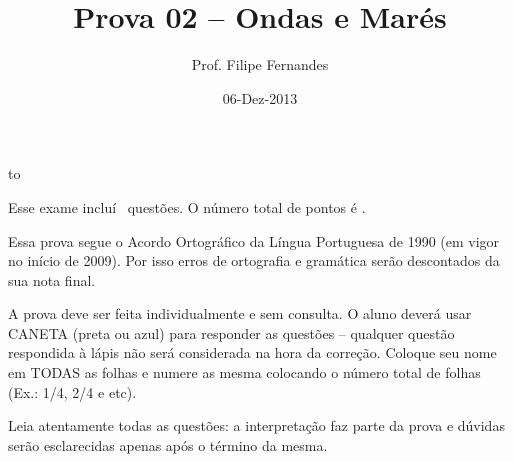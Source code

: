 \documentclass[letterpaper,portuguese,12pt,pdftex]{exam}
\title{Prova 02 -- Ondas e Marés}
\author{Prof. Filipe Fernandes}
\date{06-Dez-2013}
\begin{document}
\maketitle
\doublespacing

\vspace{2cm}
\hbox to \textwidth{Nome e número de matrícula:\enspace\hrulefill}
\vspace{2cm}

\begin{minipage}{.8\textwidth}
Esse exame incluí \numquestions\ questões. O número total de pontos é \numpoints.
\vspace{1cm}

Essa prova segue o Acordo Ortográfico da Língua Portuguesa de 1990 (em vigor no
início de 2009).  Por isso erros de ortografia e gramática serão descontados da
sua nota final.

A prova deve ser feita individualmente e sem consulta.  O aluno deverá usar
CANETA (preta ou azul) para responder as questões – qualquer questão respondida
à lápis não será considerada na hora da correção.  Coloque seu nome em TODAS as
folhas e numere as mesma colocando o número total de folhas (Ex.: 1/4, 2/4 e
etc).

\vspace{1cm}

Leia atentamente todas as questões: a interpretação faz parte da prova e dúvidas
serão esclarecidas apenas após o término da mesma.

\end{minipage}
\end{document}
